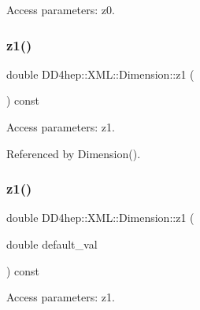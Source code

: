 Access parameters\+: z0. 

\hypertarget{struct_d_d4hep_1_1_x_m_l_1_1_dimension_ac591ad24cc4e29d2b6874457accc5d51}{}\label{struct_d_d4hep_1_1_x_m_l_1_1_dimension_ac591ad24cc4e29d2b6874457accc5d51} 
\subsubsection{\texorpdfstring{z1()}{z1()}\hspace{0.1cm}{\footnotesize\ttfamily [1/2]}}
{\footnotesize\ttfamily double D\+D4hep\+::\+X\+M\+L\+::\+Dimension\+::z1 (\begin{DoxyParamCaption}{ }\end{DoxyParamCaption}) const}



Access parameters\+: z1. 



Referenced by Dimension().

\hypertarget{struct_d_d4hep_1_1_x_m_l_1_1_dimension_a0d3c3f97eb69902451ce279d61c0f995}{}\label{struct_d_d4hep_1_1_x_m_l_1_1_dimension_a0d3c3f97eb69902451ce279d61c0f995} 
\subsubsection{\texorpdfstring{z1()}{z1()}\hspace{0.1cm}{\footnotesize\ttfamily [2/2]}}
{\footnotesize\ttfamily double D\+D4hep\+::\+X\+M\+L\+::\+Dimension\+::z1 (\begin{DoxyParamCaption}\item[{double}]{default\+\_\+val }\end{DoxyParamCaption}) const}



Access parameters\+: z1. 

\hypertarget{struct_d_d4hep_1_1_x_m_l_1_1_dimension_ac994f62521bb130662e06520423217ba}{}\label{struct_d_d4hep_1_1_x_m_l_1_1_dimension_ac994f62521bb130662e06520423217ba} 
